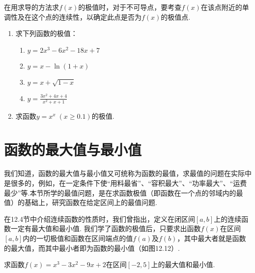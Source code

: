\begin{rmk}
    在用求导的方法求$f(x)$的极值时，对于不可导点，要考查$f(x)$在该点附近的单调性及在这个点的连续性，以确定此点是否为$f(x)$的极值点.
\end{rmk}


\begin{ex}
\begin{enumerate}
    \item 求下列函数的极值：
\begin{multicols}{2}
\begin{enumerate}[(1)]
\item $y=2x^3-6x^2-18x+7$
\item $y=x-\ln(1+x)$
\item $y=x+\sqrt{1-x}$
\item $y=\frac{3x^2+4x+4}{x^2+x+1}$
\end{enumerate}
\end{multicols}

    \item 求函数$y=x^x\; (x\ge 0.1)$的极值.
\end{enumerate}
\end{ex}

\section{函数的最大值与最小值}
我们知道，函数的最大值与最小值又可统称为函数的最值，求最值的问题在实际中是很多的，例如，在一定条件下使“用料最省”、“容积最大”、“功率最大”、“运费最少”等.本节所学的最值问题，是在求函数极值（即函数在一个点的邻域内的最值）的基础上，研究函数在给定区间上的最值问题.

在12.4节中介绍连续函数的性质时，我们曾指出，定义在闭区间$[a,b]$上的连续函数一定有最大值和最小值. 我们学了函数的极值后，只要求出函数$f(x)$在区间$[a,b]$内的一切极值和函数在区间端点的值$f(a)$及$f(b)$，其中最大者就是函数的最大值，而其中最小者即为函数的最小值（如图12.12）.

\begin{figure}[htp]
    \centering
\begin{tikzpicture}[>=stealth]
    





\end{tikzpicture}
    \caption{}
\end{figure}


\begin{example}
求函数$f(x)=x^3-3x^2-9x+2$在区间$[-2,5]$上的最大值和最小值.
\end{example}


